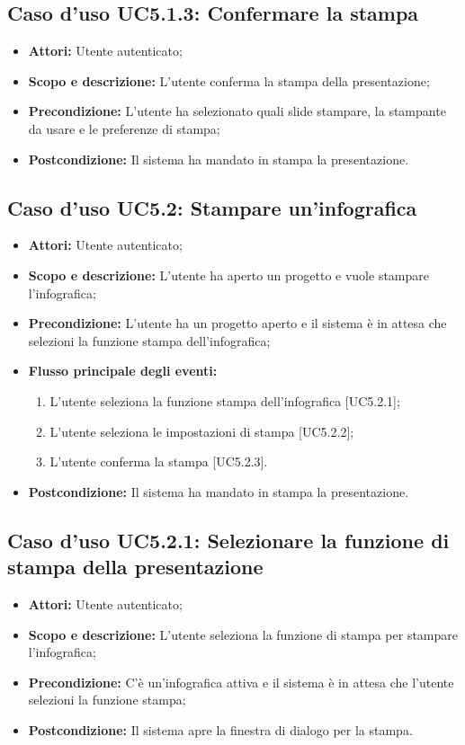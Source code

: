 	\subsection{Caso d'uso UC5.1.3: Confermare la stampa}
	\begin{itemize}
		\item \textbf{Attori:} Utente autenticato;
		\item \textbf{Scopo e descrizione:} L'utente conferma la stampa della presentazione;
		\item \textbf{Precondizione:} L'utente ha selezionato quali slide stampare, la stampante da usare e le preferenze di stampa;
		\item \textbf{Postcondizione:} Il sistema ha mandato in stampa la presentazione.
	\end{itemize}
	
	
	\subsection{Caso d'uso UC5.2: Stampare un'infografica}
	\begin{itemize}
		\item \textbf{Attori:} Utente autenticato;
		\item \textbf{Scopo e descrizione:} L'utente ha aperto un progetto e vuole stampare l'infografica;
		\item \textbf{Precondizione:} L'utente ha un progetto aperto e il sistema è in attesa che selezioni la funzione stampa dell'infografica;
		\item \textbf{Flusso principale degli eventi:}
		\begin{enumerate}
			\item L'utente seleziona la funzione stampa dell'infografica [UC5.2.1];
			\item L'utente seleziona le impostazioni di stampa [UC5.2.2];
			\item L'utente conferma la stampa [UC5.2.3].
		\end{enumerate}
		\item \textbf{Postcondizione:} Il sistema ha mandato in stampa la presentazione.
		\end{itemize}
		
		\newpage
		
		\subsection{Caso d'uso UC5.2.1: Selezionare la funzione di stampa della presentazione}
		\begin{itemize}
			\item \textbf{Attori:} Utente autenticato;
			\item \textbf{Scopo e descrizione:} L'utente seleziona la funzione di stampa per stampare l'infografica;
			\item \textbf{Precondizione:} C'è un'infografica attiva e il sistema è in attesa che l'utente selezioni la funzione stampa;
			\item \textbf{Postcondizione:} Il sistema apre la finestra di dialogo per la stampa.
		\end{itemize}
		
